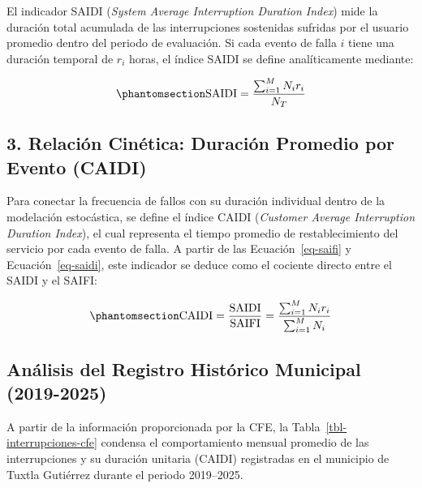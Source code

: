 \documentclass[
  spanish,
  letterpaper,
  DIV=11,
  numbers=noendperiod]{scrreprt}
\theoremstyle{plain}
\theoremstyle{definition}
\theoremstyle{remark}
\begin{document}
El indicador SAIDI (\emph{System Average Interruption Duration Index})
mide la duración total acumulada de las interrupciones sostenidas
sufridas por el usuario promedio dentro del periodo de evaluación. Si
cada evento de falla \(i\) tiene una duración temporal de \(r_i\) horas,
el índice SAIDI se define analíticamente mediante:

\begin{equation}\phantomsection\label{eq-saidi}{
\text{SAIDI} = \frac{\sum_{i=1}^{M} N_i r_i}{N_T}
}\end{equation}

\subsection{3. Relación Cinética: Duración Promedio por Evento
(CAIDI)}\label{relaciuxf3n-cinuxe9tica-duraciuxf3n-promedio-por-evento-caidi}

Para conectar la frecuencia de fallos con su duración individual dentro
de la modelación estocástica, se define el índice CAIDI (\emph{Customer
Average Interruption Duration Index}), el cual representa el tiempo
promedio de restablecimiento del servicio por cada evento de falla. A
partir de las Ecuación~\ref{eq-saifi} y Ecuación~\ref{eq-saidi}, este
indicador se deduce como el cociente directo entre el SAIDI y el SAIFI:

\begin{equation}\phantomsection\label{eq-caidi}{
\text{CAIDI} = \frac{\text{SAIDI}}{\text{SAIFI}} = \frac{\sum_{i=1}^{M} N_i r_i}{\sum_{i=1}^{M} N_i}
}\end{equation}

\subsection{Análisis del Registro Histórico Municipal
(2019-2025)}\label{anuxe1lisis-del-registro-histuxf3rico-municipal-2019-2025}

A partir de la información proporcionada por la CFE, la
Tabla~\ref{tbl-interrupciones-cfe} condensa el comportamiento mensual
promedio de las interrupciones y su duración unitaria (\(\text{CAIDI}\))
registradas en el municipio de Tuxtla Gutiérrez durante el periodo
2019--2025.
\end{document}
